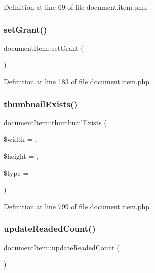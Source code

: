 Definition at line 69 of file document.\+item.\+php.

\hypertarget{classdocumentItem_a4a60e218cd41d2e23cf72bb720cf1cd8}{}\label{classdocumentItem_a4a60e218cd41d2e23cf72bb720cf1cd8} 
\subsubsection{\texorpdfstring{set\+Grant()}{setGrant()}}
{\footnotesize\ttfamily document\+Item\+::set\+Grant (\begin{DoxyParamCaption}{ }\end{DoxyParamCaption})}



Definition at line 183 of file document.\+item.\+php.

\hypertarget{classdocumentItem_afb61d7a6035bceb7a48e3db699c6127b}{}\label{classdocumentItem_afb61d7a6035bceb7a48e3db699c6127b} 
\subsubsection{\texorpdfstring{thumbnail\+Exists()}{thumbnailExists()}}
{\footnotesize\ttfamily document\+Item\+::thumbnail\+Exists (\begin{DoxyParamCaption}\item[{}]{\$width = {},  }\item[{}]{\$height = {},  }\item[{}]{\$type = {\ttfamily \textquotesingle{}\textquotesingle{}} }\end{DoxyParamCaption})}



Definition at line 799 of file document.\+item.\+php.

\hypertarget{classdocumentItem_ac268c88d87f12155e5885510213028e3}{}\label{classdocumentItem_ac268c88d87f12155e5885510213028e3} 
\subsubsection{\texorpdfstring{update\+Readed\+Count()}{updateReadedCount()}}
{\footnotesize\ttfamily document\+Item\+::update\+Readed\+Count (\begin{DoxyParamCaption}{ }\end{DoxyParamCaption})}

